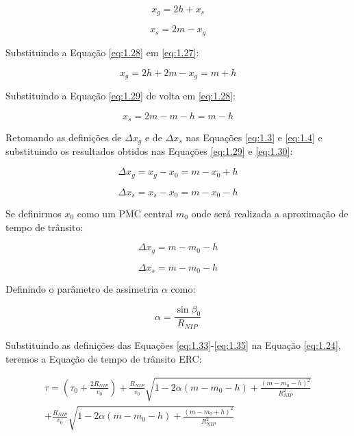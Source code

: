 \documentclass[a4paper, 12pt]{article}
\begin{document}
\begin{equation}
 \label{eq:1.27}
 x_g = 2h + x_s
\end{equation}

\begin{equation}
 \label{eq:1.28}
 x_s = 2m - x_g
\end{equation}

Substituindo a Equação \ref{eq:1.28} em \ref{eq:1.27}:

\begin{equation}
 \label{eq:1.29}
 x_g = 2h + 2m - x_g = m + h
\end{equation}

Substituindo a Equação \ref{eq:1.29} de volta em \ref{eq:1.28}:

\begin{equation}
 \label{eq:1.30}
 x_s = 2m - m -h = m - h
\end{equation}

Retomando as definições de $\Delta x_g$ e de $\Delta x_s$ nas Equações \ref{eq:1.3} e \ref{eq:1.4}
e substituindo os resultados obtidos nas Equações \ref{eq:1.29} e \ref{eq:1.30}:

\begin{equation}
 \label{eq:1.31}
 \Delta x_g = x_g - x_0 = m - x_0 + h
\end{equation}

\begin{equation}
 \label{eq:1.32}
 \Delta x_s = x_s - x_0 = m - x_0 - h
\end{equation}

Se definirmos $x_0$ como um PMC central $m_0$ onde será realizada a aproximação de tempo de trânsito:

\begin{equation}
 \label{eq:1.33}
 \Delta x_g = m - m_0 - h
\end{equation}

\begin{equation}
 \label{eq:1.34}
 \Delta x_s = m - m_0 - h
\end{equation}

Definindo o parâmetro de assimetria $\alpha$ como:

\begin{equation}
 \label{eq:1.35}
 \alpha = \frac{\sin \beta_0}{R_{NIP}}
\end{equation}

Substituindo as definições das Equações \ref{eq:1.33}-\ref{eq:1.35} na
Equação \ref{eq:1.24}, teremos a Equação de tempo de trânsito ERC:

\begin{multline}
 \label{eq:1.36}
\tau = \left( \tau_0 + \frac{2 R_{NIP}}{v_0} \right)
+ \frac{R_{NIP}}{v_0} \sqrt{  1 - 2 \alpha (m - m_0 - h) + \frac{(m - m_0 - h)^2}{R_{NIP}^2} } \\
+ \frac{R_{NIP}}{v_0}  \sqrt{  1 - 2 \alpha (m - m_0 - h) + \frac{(m - m_0 + h)^2}{R_{NIP}^2} }
\end{multline}
\end{document}
